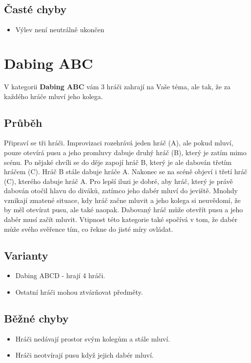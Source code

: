 \documentclass[main.tex]{subfiles}
\begin{document}
\subsection{ Časté chyby } \begin{itemize}
\item  Výlev není neutrálně ukončen
\end{itemize}
 
 
 
 
 
\needspace{5cm} \section{Dabing ABC} \label{dabing abc}  
 
V kategorii \textbf{Dabing ABC}{} vám 3 hráči zahrají na Vaše téma, ale tak, že za každého hráče mluví jeho kolega. 
 
\subsection{Průběh} Připraví se tři hráči. Improvizaci rozehrává jeden hráč (A), ale pokud mluví, pouze otevírá pusu a jeho promluvy dabuje druhý hráč (B), který je zatím mimo scénu. Po nějaké chvíli se do děje zapojí hráč B, který je ale dabován třetím hráčem (C). Hráč B stále dabuje hráče A. Nakonec se na scéně objeví i třetí hráč (C), kterého dabuje hráč A. Pro lepší iluzi je dobré, aby hráč, který je právě dabován otočil hlavu do diváků, zatímco jeho dabér mluví do jeviště. Mnohdy vznikají zmatené situace, kdy hráč začne mluvit a jeho kolega si neuvědomí, že by měl otevírat pusu, ale také naopak. Dabovaný hráč může otevřít pusu a jeho dabér musí začít mluvit. Vtipnost této kategorie také spočívá v tom, že dabér může svého svěřence tím, co řekne do jisté míry ovládat. 
 
\subsection{ Varianty } \begin{itemize}
\item Dabing ABCD - hrají 4 hráči.
\item Ostatní hráči mohou ztvárňovat předměty.
\end{itemize}
 
\subsection{ Běžné chyby } \begin{itemize}
\item Hráči nedávají prostor svým kolegům a stále mluví.
\item Hráči neotvírají pusu když jejich dabér mluví.
\end{itemize}
 
\end{document}
